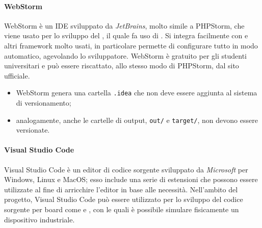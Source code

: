 				\paragraph{WebStorm}
					WebStorm è un IDE sviluppato da \textit{JetBrains}, molto simile a PHPStorm, che viene usato per lo sviluppo del , il quale fa uso di .
					\newline
					Si integra facilmente con  e altri framework molto usati, in particolare permette di configurare tutto in modo automatico, agevolando lo sviluppatore.
					\newline
					WebStorm è gratuito per gli studenti universitari e può essere riscattato, allo stesso modo di PHPStorm, dal sito ufficiale. 
					
					\begin{itemize}
						\item WebStorm genera una cartella \verb!.idea! che non deve essere aggiunta al sistema di versionamento;
						\item analogamente, anche le cartelle di output, \verb!out/! e \verb!target/!, non devono essere versionate.
					\end{itemize}
				
				\paragraph{Visual Studio Code} 
					Visual Studio Code è un editor di codice sorgente sviluppato da \textit{Microsoft} per Windows, Linux e MacOS; esso include una serie di estensioni che possono essere utilizzate al fine di arricchire l'editor in base alle necessità.
					\newline
					Nell'ambito del progetto, Visual Studio Code può essere utilizzato per lo sviluppo del codice sorgente per board come  e , con le quali è possibile simulare fisicamente un dispositivo industriale.
				
